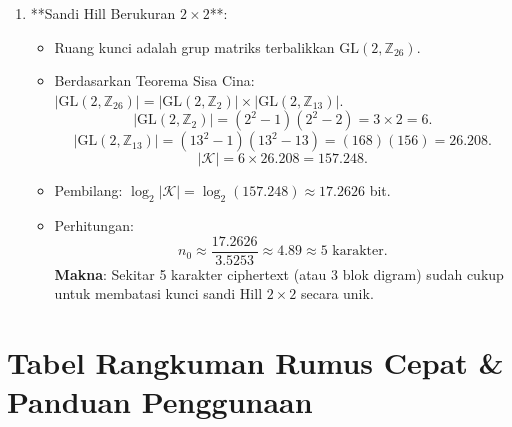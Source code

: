 \documentclass[11pt,a4paper]{article}
\begin{document}
\begin{enumerate}[leftmargin=*]
    \item **Sandi Hill Berukuran $2 \times 2$**:
    \begin{itemize}
        \item Ruang kunci adalah grup matriks terbalikkan $\mathrm{GL}(2, \mathbb{Z}_{26})$.
        \item Berdasarkan Teorema Sisa Cina: $|\mathrm{GL}(2, \mathbb{Z}_{26})| = |\mathrm{GL}(2, \mathbb{Z}_{2})| \times |\mathrm{GL}(2, \mathbb{Z}_{13})|$.
        \[
        |\mathrm{GL}(2, \mathbb{Z}_{2})| = (2^2 - 1)(2^2 - 2) = 3 \times 2 = 6.
        \]
        \[
        |\mathrm{GL}(2, \mathbb{Z}_{13})| = (13^2 - 1)(13^2 - 13) = (168)(156) = 26.208.
        \]
        \[
        |\mathcal{K}| = 6 \times 26.208 = 157.248.
        \]
        \item Pembilang: $\log_2 |\mathcal{K}| = \log_2(157.248) \approx 17.2626$ bit.
        \item Perhitungan:
        \[
        n_0 \approx \frac{17.2626}{3.5253} \approx 4.89 \approx 5 \text{ karakter}.
        \]
        \textbf{Makna}: Sekitar 5 karakter ciphertext (atau 3 blok digram) sudah cukup untuk membatasi kunci sandi Hill $2 \times 2$ secara unik.
    \end{itemize}
\end{enumerate}

\section{Tabel Rangkuman Rumus Cepat \& Panduan Penggunaan}
\end{document}
